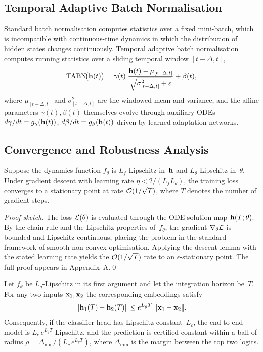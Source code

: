 \subsection{Temporal Adaptive Batch Normalisation}

Standard batch normalisation computes statistics over a fixed mini-batch, which is incompatible with continuous-time dynamics in which the distribution of hidden states changes continuously. Temporal adaptive batch normalisation computes running statistics over a sliding temporal window $[t-\Delta,t]$,
\begin{equation}
\mathrm{TABN}\!\bigl(\mathbf{h}(t)\bigr)
= \gamma(t)\;\frac{\mathbf{h}(t)-\mu_{[t-\Delta,t]}}
  {\sqrt{\sigma^2_{[t-\Delta,t]}+\varepsilon}}
+ \beta(t),
\label{eq:tabn}
\end{equation}
where $\mu_{[t-\Delta,t]}$ and $\sigma^2_{[t-\Delta,t]}$ are the windowed mean and variance, and the affine parameters $\gamma(t),\beta(t)$ themselves evolve through auxiliary ODEs $d\gamma/dt=g_\gamma(\mathbf{h}(t))$, $d\beta/dt=g_\beta(\mathbf{h}(t))$ driven by learned adaptation networks.

\subsection{Convergence and Robustness Analysis}

\begin{theorem}
\label{thm:ct_tgnn_conv}
Suppose the dynamics function $f_\theta$ is $L_f$-Lipschitz in~$\mathbf{h}$ and $L_\theta$-Lipschitz in~$\theta$. Under gradient descent with learning rate $\eta<2/(L_f L_\theta)$, the training loss converges to a stationary point at rate $\mathcal{O}(1/\sqrt{T})$, where $T$ denotes the number of gradient steps.
\end{theorem}

\noindent\textit{Proof sketch.} The loss $\mathcal{L}(\theta)$ is evaluated through the ODE solution map $\mathbf{h}(T;\theta)$. By the chain rule and the Lipschitz properties of~$f_\theta$, the gradient $\nabla_\theta\mathcal{L}$ is bounded and Lipschitz-continuous, placing the problem in the standard framework of smooth non-convex optimisation. Applying the descent lemma with the stated learning rate yields the $\mathcal{O}(1/\sqrt{T})$ rate to an $\epsilon$-stationary point. The full proof appears in Appendix~A.\qed

\begin{theorem}
\label{thm:ct_tgnn_rob}
Let $f_\theta$ be $L_g$-Lipschitz in its first argument and let the integration horizon be~$T$. For any two inputs $\mathbf{x}_1,\mathbf{x}_2$ the corresponding embeddings satisfy
\begin{equation}
\|\mathbf{h}_1(T)-\mathbf{h}_2(T)\|
\le e^{L_g T}\;\|\mathbf{x}_1-\mathbf{x}_2\|.
\label{eq:lip_cert}
\end{equation}
Consequently, if the classifier head has Lipschitz constant~$L_c$, the end-to-end model is $L_c\,e^{L_g T}$-Lipschitz, and the prediction is certified constant within a ball of radius $\rho = \Delta_{\min}/(L_c\,e^{L_g T})$, where $\Delta_{\min}$ is the margin between the top two logits.
\end{theorem}


